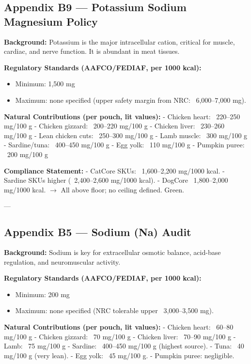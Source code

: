 \subsection*{Appendix B9 --- Potassium Sodium Magnesium Policy}

\textbf{Background:}  
Potassium is the major intracellular cation, critical for muscle, cardiac, and nerve function. It is abundant in meat tissues.  

\textbf{Regulatory Standards (AAFCO/FEDIAF, per 1000 kcal):}  
\begin{itemize}[leftmargin=1.2em]
  \item Minimum: 1,500 mg  
  \item Maximum: none specified (upper safety margin from NRC: ~6,000--7,000 mg).  
\end{itemize}

\textbf{Natural Contributions (per pouch, lit values):}  
- Chicken heart: ~220--250 mg/100 g  
- Chicken gizzard: ~200--220 mg/100 g  
- Chicken liver: ~230--260 mg/100 g  
- Lean chicken cuts: ~250--300 mg/100 g  
- Lamb muscle: ~300 mg/100 g  
- Sardine/tuna: ~400--450 mg/100 g  
- Egg yolk: ~110 mg/100 g  
- Pumpkin puree: ~200 mg/100 g  

\textbf{Compliance Statement:}  
- CatCore SKUs: ~1,600--2,200 mg/1000 kcal.  
- Sardine SKUs higher (~2,400--2,600 mg/1000 kcal).  
- DogCore ~1,800--2,000 mg/1000 kcal.  
$\rightarrow$ All above floor; no ceiling defined. Green.

---

\subsection*{Appendix B5 --- Sodium (Na) Audit}

\textbf{Background:}  
Sodium is key for extracellular osmotic balance, acid-base regulation, and neuromuscular activity.  

\textbf{Regulatory Standards (AAFCO/FEDIAF, per 1000 kcal):}  
\begin{itemize}[leftmargin=1.2em]
  \item Minimum: 200 mg  
  \item Maximum: none specified (NRC tolerable upper ~3,000--3,500 mg).  
\end{itemize}

\textbf{Natural Contributions (per pouch, lit values):}  
- Chicken heart: ~60--80 mg/100 g  
- Chicken gizzard: ~70 mg/100 g  
- Chicken liver: ~70--90 mg/100 g  
- Lamb: ~75 mg/100 g  
- Sardine: ~400--450 mg/100 g (highest source).  
- Tuna: ~40 mg/100 g (very lean).  
- Egg yolk: ~45 mg/100 g.  
- Pumpkin puree: negligible.  

